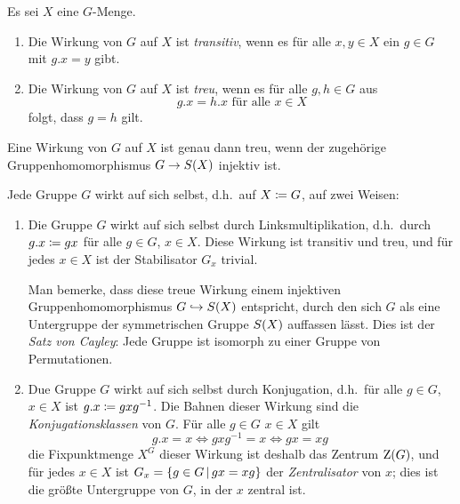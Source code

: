\begin{definition}
  Es sei $X$ eine $G$-Menge.
  \begin{enumerate}
    \item
      Die Wirkung von $G$ auf $X$ ist \emph{transitiv}, wenn es für alle $x, y \in X$ ein $g \in G$ mit $g.x = y$ gibt.
    \item
      Die Wirkung von $G$ auf $X$ ist \emph{treu}, wenn es für alle $g, h \in G$ aus
      \[
        \text{$g.x = h.x$ für alle $x \in X$}
      \]
      folgt, dass $g = h$ gilt.
  \end{enumerate}
\end{definition}

\begin{remark}
  Eine Wirkung von $G$ auf $X$ ist genau dann treu, wenn der zugehörige Gruppenhomomorphismus $G \to S(X)$ injektiv ist.
\end{remark}

\begin{example}
  Jede Gruppe $G$ wirkt auf sich selbst, d.h.\ auf $X \coloneqq G$, auf zwei Weisen:
  \begin{enumerate}
    \item
      Die Gruppe $G$ wirkt auf sich selbst durch Linksmultiplikation, d.h.\ durch $g.x \coloneqq gx$ für alle $g \in G$, $x \in X$.
      Diese Wirkung ist transitiv und treu, und für jedes $x \in X$ ist der Stabilisator $G_x$ trivial.
      
      Man bemerke, dass diese treue Wirkung einem injektiven Gruppenhomomorphismus $G \hookrightarrow S(X)$ entspricht, durch den sich $G$ als eine Untergruppe der symmetrischen Gruppe $S(X)$ auffassen lässt.
      Dies ist der \emph{Satz von Cayley}:
      Jede Gruppe ist isomorph zu einer Gruppe von Permutationen.
    \item
      Due Gruppe $G$ wirkt auf sich selbst durch Konjugation, d.h.\ für alle $g \in G$, $x \in X$ ist $g.x \coloneqq gxg^{-1}$.
      Die Bahnen dieser Wirkung sind die \emph{Konjugationsklassen} von $G$.
      Für alle $g \in G$ $x \in X$ gilt
      \[
          g.x
        = x
        \iff
          gxg^{-1}
        = x
        \iff
          gx
        = xg \;
      \]
      die Fixpunktmenge $X^G$ dieser Wirkung ist deshalb das Zentrum $\operatorname{Z}(G)$, und für jedes $x \in X$ ist $G_x = \{g \in G \suchthat gx = xg\}$ der \emph{Zentralisator} von $x$;
      dies ist die größte Untergruppe von $G$, in der $x$ zentral ist.
  \end{enumerate}
\end{example}


